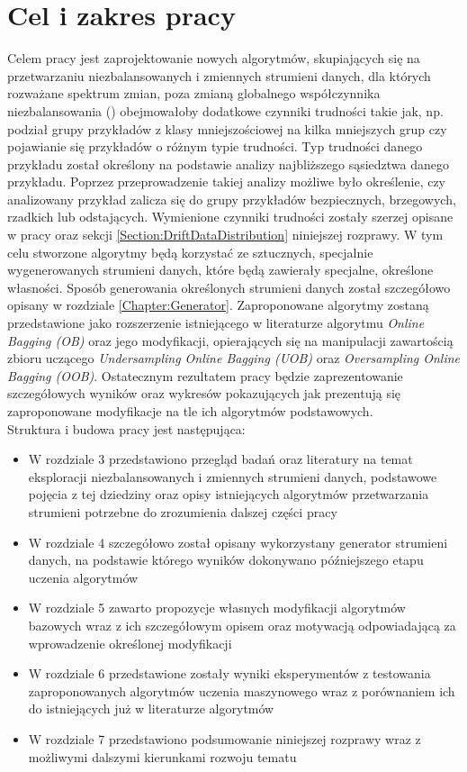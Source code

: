 \chapter{Cel i zakres pracy}

\noindent Celem pracy jest zaprojektowanie nowych algorytmów, skupiających się na przetwarzaniu niezbalansowanych i zmiennych strumieni danych, dla których rozważane spektrum zmian, poza zmianą globalnego współczynnika niezbalansowania () obejmowałoby dodatkowe czynniki trudności takie jak, np. podział grupy przykładów z klasy mniejszościowej na kilka mniejszych grup czy pojawianie się przykładów o różnym typie trudności. Typ trudności danego przykładu został określony na podstawie analizy najbliższego sąsiedztwa danego przykładu. Poprzez przeprowadzenie takiej analizy możliwe było określenie, czy analizowany przykład zalicza się do grupy przykładów bezpiecznych, brzegowych, rzadkich lub odstających. Wymienione czynniki trudności zostały szerzej opisane w pracy \cite{Article:TypyPrzykladow} oraz sekcji \ref{Section:DriftDataDistribution} niniejszej rozprawy. W tym celu stworzone algorytmy będą korzystać ze sztucznych, specjalnie wygenerowanych strumieni danych, które będą zawierały specjalne, określone własności. Sposób generowania określonych strumieni danych został szczegółowo opisany w rozdziale \ref{Chapter:Generator}. Zaproponowane algorytmy zostaną przedstawione jako rozszerzenie istniejącego w literaturze algorytmu \textit{Online Bagging (OB)} oraz jego modyfikacji, opierających się na manipulacji zawartością zbioru uczącego \textit{Undersampling Online Bagging (UOB)} oraz \textit{Oversampling Online Bagging (OOB)}. Ostatecznym rezultatem pracy będzie zaprezentowanie szczegółowych wyników oraz wykresów pokazujących jak prezentują się zaproponowane modyfikacje na tle ich algorytmów podstawowych.\\

\noindent Struktura i budowa pracy jest następująca:

\begin{itemize}
    \item W rozdziale 3 przedstawiono przegląd badań oraz literatury na temat eksploracji niezbalansowanych i zmiennych strumieni danych, podstawowe pojęcia z tej dziedziny oraz opisy istniejących algorytmów przetwarzania strumieni potrzebne do zrozumienia dalszej części pracy
    \item W rozdziale 4 szczegółowo został opisany wykorzystany generator strumieni danych, na podstawie którego wyników dokonywano późniejszego etapu uczenia algorytmów
    \item W rozdziale 5 zawarto propozycje własnych modyfikacji algorytmów bazowych wraz z ich szczegółowym opisem oraz motywacją odpowiadającą za wprowadzenie określonej modyfikacji
    \item W rozdziale 6 przedstawione zostały wyniki eksperymentów z testowania zaproponowanych algorytmów uczenia maszynowego wraz z porównaniem ich do istniejących już w literaturze algorytmów
    \item W rozdziale 7 przedstawiono podsumowanie niniejszej rozprawy wraz z możliwymi dalszymi kierunkami rozwoju tematu
\end{itemize}

